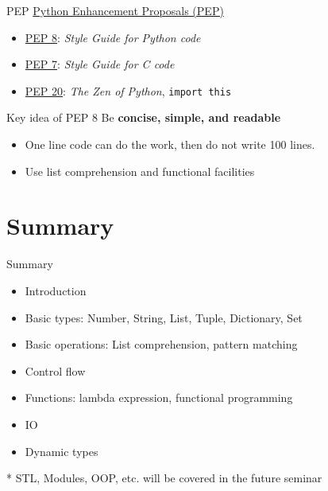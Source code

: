 \documentclass{../TexTemplate/myslide}
\begin{document}
\begin{frame}[fragile]{PEP}
\href{https://www.python.org/dev/peps/}{Python Enhancement Proposals (PEP)}
\begin{itemize}
	\item \href{https://www.python.org/dev/peps/pep-0008/}{PEP 8}: \emph{Style Guide for Python code}
	\item \href{https://www.python.org/dev/peps/pep-0007/}{PEP 7}: \emph{Style Guide for C code}
	\item \href{https://www.python.org/dev/peps/pep-0020/}{PEP 20}: \emph{The Zen of Python}, \verb'import this'
\end{itemize}
\end{frame}

\begin{frame}{Key idea of PEP 8}
Be \textbf{concise, simple, and readable}
\begin{itemize}
	\item One line code can do the work, then do not write 100 lines.
	\item Use list comprehension and functional facilities
\end{itemize}
\end{frame}

\section{Summary}
\begin{frame}
\sectionpage
\end{frame}

\begin{frame}{Summary}
\begin{itemize}
	\item Introduction
	\item Basic types: Number, String, List, Tuple, Dictionary, Set
	\item Basic operations: List comprehension, pattern matching
	\item Control flow
	\item Functions: lambda expression, functional programming
	\item IO
	\item Dynamic types
\end{itemize}
* STL, Modules, OOP, etc. will be covered in the future seminar
\end{frame}

\end{document}
